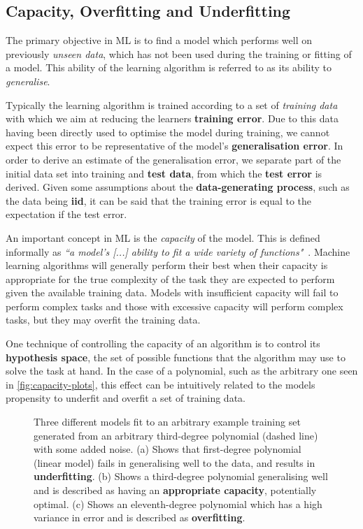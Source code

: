 \subsection{Capacity, Overfitting and Underfitting}
The primary objective in \gls{ML} is to find a model which performs well on
previously \textit{unseen data}, which has not been used during the training or
fitting of a model. This ability of the learning algorithm is referred to as its
ability to \textit{generalise}.

Typically the learning algorithm is trained according to a set of
\textit{training data} with which we aim at reducing the learners
\textbf{training error}. Due to this data having been directly used to optimise
the model during training, we cannot expect this error to be representative of
the model's \textbf{generalisation error}. In order to derive an estimate of the
generalisation error, we separate part of the initial data set into training and
\textbf{test data}, from which the \textbf{test error} is derived. Given some
assumptions about the \textbf{data-generating process}, such as the data being
\textbf{\gls{iid}}, it can be said that the training error is equal to the
expectation if the test error.

An important concept in \gls{ML} is the \textit{capacity} of the model. This is
defined informally as \textit{``a model’s [...] ability to fit a wide
variety of functions"}~\cite[p.~111-112]{Goodfellow-et-al-2016}. Machine learning
algorithms will generally perform their best when their capacity is appropriate
for the true complexity of the task they are expected to perform given the
available training data. Models with insufficient capacity will fail to perform
complex tasks and those with excessive capacity will perform complex tasks, but
they may overfit the training data.

One technique of controlling the capacity of an algorithm is to control its
\textbf{hypothesis space}, the set of possible functions that the algorithm may
use to solve the task at hand. In the case of a polynomial, such as the
arbitrary one seen in \autoref{fig:capacity-plots}, this effect can be
intuitively related to the models propensity to underfit and overfit a set of
training data.

\begin{figure}[htp]
    \centering
    
    \captionsetup{format=hang} %
    \caption{
        Three different models fit to an arbitrary example training set
        generated from an arbitrary third-degree polynomial (dashed line) with
        some added noise. (a) Shows that first-degree polynomial (linear model)
        fails in generalising well to the data, and results in
        \textbf{underfitting}. (b) Shows a third-degree polynomial generalising
        well and is described as having an \textbf{appropriate capacity},
        potentially optimal. (c) Shows an eleventh-degree polynomial which has a
        high variance in error and is described as \textbf{overfitting}.
    }
    \label{fig:capacity-plots}
\end{figure}

